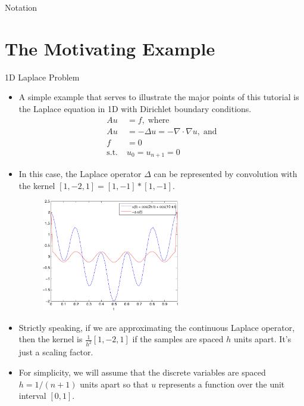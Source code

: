 \documentclass{beamer}
\begin{document}
\begin{frame}[allowpagebreaks]{Notation}
 
\end{frame}

\section{The Motivating Example}%

\begin{frame}[allowframebreaks]{1D Laplace Problem}
 \begin{itemize}
  \item A simple example that serves to illustrate the major points of this
        tutorial is the Laplace equation in 1D with Dirichlet boundary
        conditions.
  \begin{align}
   Au &= f, \; \text{where} \label{eq:laplace} \\
   Au &= -\Delta u = - \nabla \cdot \nabla u, \; \text{and} \nonumber \\
   f &= 0 \nonumber \\
   \text{s.t.} \; & u_0 = u_{n+1} = 0 \nonumber
  \end{align}
  \item In this case, the Laplace operator $\Delta$ can be represented by
        convolution with the kernel $[1,-2,1] = [1,-1]\ast[1,-1]$.
  \begin{figure}
   \includegraphics[width=6cm]{images/laplaceOperatorExample.pdf}
  \end{figure}
  \item Strictly speaking, if we are approximating the continuous Laplace
        operator, then the kernel is $\frac{1}{h^2}[1,-2,1]$ if the samples
        are spaced $h$ units apart. It's just a scaling factor.
  \item For simplicity, we will assume that the discrete variables are spaced
        $h = 1/(n+1)$ units apart so that $u$ represents a function over the
        unit interval $[0,1]$.

\end{itemize}
\end{frame}
\end{document}
